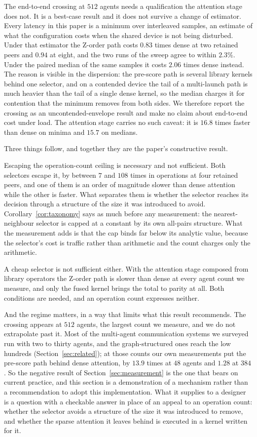 The end-to-end crossing at $512$ agents needs a qualification the attention
stage does not. It is a best-case result and it does not survive a change of
estimator. Every latency in this paper is a minimum over interleaved samples, an
estimate of what the configuration costs when the shared device is not being
disturbed. Under that estimator the Z-order path costs $0.83$ times dense at two
retained peers and $0.94$ at eight, and the two runs of the sweep agree to
within $2.3\%$. Under the paired median of the same samples it costs $2.06$
times dense instead. The reason is visible in the dispersion: the pre-score path
is several library kernels behind one selector, and on a contended device the
tail of a multi-launch path is much heavier than the tail of a single dense
kernel, so the median charges it for contention that the minimum removes from
both sides. We therefore report the crossing as an uncontended-envelope result
and make no claim about end-to-end cost under load. The attention stage carries
no such caveat: it is $16.8$ times faster than dense on minima and $15.7$ on
medians.

Three things follow, and together they are the paper's constructive result.

Escaping the operation-count ceiling is necessary and not sufficient. Both
selectors escape it, by between $7$ and $108$ times in operations at
four retained peers, and one of
them is an order of magnitude slower than dense attention while the other is
faster. What separates them is whether the selector reaches its decision through
a structure of the size it was introduced to avoid.
Corollary~\ref{cor:taxonomy} says as much before any measurement: the
nearest-neighbour selector is capped at a constant by its own all-pairs
structure. What the measurement adds is that the cap binds far below its
analytic value, because the selector's cost is traffic rather than arithmetic
and the count charges only the arithmetic.

A cheap selector is not sufficient either. With the attention stage composed
from library operators the Z-order path is slower than dense at every agent
count we measure, and only the fused kernel brings the total to parity at all.
Both conditions are needed, and an operation count expresses neither.

And the regime matters, in a way that limits what this result recommends. The
crossing appears at $512$ agents, the largest count we measure, and we do not
extrapolate past it. Most of the multi-agent communication systems we surveyed
run with two to thirty agents, and the graph-structured ones reach the low
hundreds (Section~\ref{sec:related}); at those counts our own measurements put
the pre-score path behind dense attention, by $13.9$ times at $48$ agents and
$1.28$ at $384$. So the negative result of Section~\ref{sec:measurement} is the
one that bears on current practice, and this section is a demonstration of a
mechanism rather than a recommendation to adopt this implementation. What it
supplies to a designer is a question with a checkable answer in place of an
appeal to an operation count: whether the selector avoids a structure of the
size it was introduced to remove, and whether the sparse attention it leaves
behind is executed in a kernel written for it.
